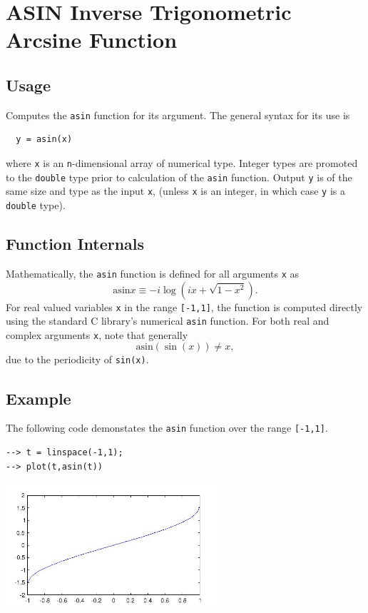 \section{ASIN Inverse Trigonometric Arcsine Function}

\subsection{Usage}

Computes the \verb|asin| function for its argument.  The general
syntax for its use is
\begin{verbatim}
  y = asin(x)
\end{verbatim}
where \verb|x| is an \verb|n|-dimensional array of numerical type.
Integer types are promoted to the \verb|double| type prior to
calculation of the \verb|asin| function.  Output \verb|y| is of the
same size and type as the input \verb|x|, (unless \verb|x| is an
integer, in which case \verb|y| is a \verb|double| type).  
\subsection{Function Internals}

Mathematically, the \verb|asin| function is defined for all 
arguments \verb|x| as
\[
   \mathrm{asin} x \equiv - i \log \left(i x + 
   \sqrt{1-x^2}\right).
\]
For real valued variables \verb|x| in the range \verb|[-1,1]|, the function is
computed directly using the standard C library's numerical \verb|asin|
function. For both real and complex arguments \verb|x|, note that generally
\[
   \mathrm{asin}(\sin(x)) \neq x,
\]
due to the periodicity of \verb|sin(x)|.
\subsection{Example}

The following code demonstates the \verb|asin| function over the range 
\verb|[-1,1]|.
\begin{verbatim}
--> t = linspace(-1,1);
--> plot(t,asin(t))
\end{verbatim}


\centerline{\includegraphics[width=8cm]{asinplot}}

